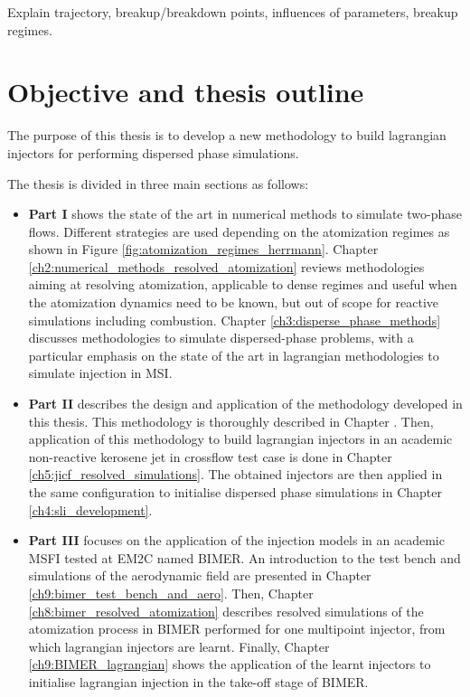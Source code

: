 Explain trajectory, breakup/breakdown points, influences of parameters, breakup regimes.



\section{Objective and thesis outline}
    
The purpose of this thesis is to develop a new methodology to build lagrangian injectors for performing dispersed phase simulations. 

The thesis is divided in three main sections as follows:

\begin{itemize}

	\item \textbf{Part I} shows the state of the art in numerical methods to simulate two-phase flows. Different strategies are used depending on the atomization regimes as shown in Figure \ref{fig:atomization_regimes_herrmann}. Chapter \ref{ch2:numerical_methods_resolved_atomization} reviews methodologies aiming at resolving atomization, applicable to dense regimes and useful when the atomization dynamics need to be known, but out of scope for reactive simulations including combustion. Chapter \ref{ch3:disperse_phase_methods} discusses methodologies to simulate dispersed-phase problems, with a particular emphasis on the state of the art in lagrangian methodologies to simulate injection in MSI.
	
	\item \textbf{Part II} describes the design and application of the methodology developed in this thesis. This methodology is thoroughly described in Chapter . Then, application of this methodology to build lagrangian injectors in an academic non-reactive kerosene jet in crossflow test case is done in Chapter \ref{ch5:jicf_resolved_simulations}. The obtained injectors are then applied in the same configuration to initialise dispersed phase simulations in Chapter \ref{ch4:sli_development}.
	
	\item \textbf{Part III} focuses on the application of the injection models in an academic MSFI tested at EM2C named BIMER. An introduction to the test bench and simulations of the aerodynamic field are presented in Chapter \ref{ch9:bimer_test_bench_and_aero}. Then, Chapter \ref{ch8:bimer_resolved_atomization} describes resolved simulations of the atomization process in BIMER performed for one multipoint injector, from which lagrangian injectors are learnt. Finally, Chapter \ref{ch9:BIMER_lagrangian} shows the application of the learnt injectors to initialise lagrangian injection in the take-off stage of BIMER.

\end{itemize}

